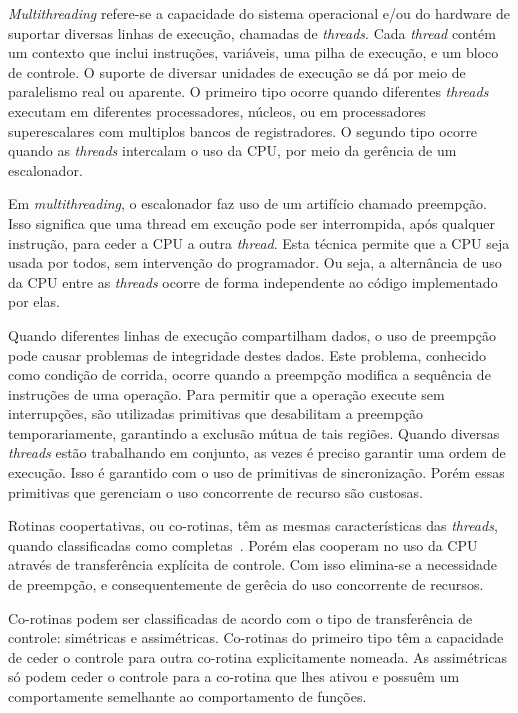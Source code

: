 \textit{Multithreading} refere-se a capacidade do sistema operacional e/ou do hardware de suportar diversas linhas de
execução, chamadas de \textit{threads}. Cada \textit{thread} contém um contexto que inclui instruções, variáveis, uma 
pilha de execução, e um bloco de controle. O suporte de diversar unidades de execução se dá por meio de paralelismo real
ou aparente. O primeiro tipo ocorre quando diferentes \textit{threads} executam em diferentes processadores, núcleos, ou
em processadores superescalares com multiplos bancos de registradores. O segundo tipo ocorre quando as \textit{threads}
intercalam o uso da CPU, por meio da gerência de um escalonador.

Em \textit{multithreading}, o escalonador faz uso de um artifício chamado preempção. Isso significa que uma thread em excução pode ser interrompida, 
após qualquer instrução, para ceder a CPU a outra \textit{thread}. Esta técnica permite que a CPU seja usada por todos, sem intervenção
do programador. Ou seja, a alternância de uso da CPU entre as \textit{threads} ocorre de forma independente ao código
implementado por elas.

Quando diferentes linhas de execução compartilham dados, o uso de preempção pode causar problemas de integridade destes
dados. Este problema, conhecido como condição de corrida, ocorre quando a preempção modifica a sequência de instruções
de uma operação. Para permitir que a operação execute sem interrupções, são utilizadas primitivas que desabilitam a
preempção temporariamente, garantindo a exclusão mútua de tais regiões.
Quando diversas \textit{threads} estão trabalhando em conjunto, as vezes é preciso garantir uma ordem de execução. Isso
é garantido com o uso de primitivas de sincronização.
Porém essas primitivas que gerenciam o uso concorrente de recurso são custosas.~\cite{Stallings/04}

Rotinas coopertativas, ou co-rotinas, têm as mesmas características das \textit{threads}, quando classificadas como
completas~\cite[s. 2.4]{Moura/04}. Porém elas cooperam no uso da CPU através de transferência explícita de controle. Com
isso elimina-se a necessidade de preempção, e consequentemente de gerêcia do uso concorrente de recursos.

Co-rotinas podem ser classificadas de acordo com o tipo de transferência de controle: simétricas e assimétricas. 
Co-rotinas do primeiro tipo têm a capacidade de ceder o controle para outra co-rotina explicitamente nomeada.
As assimétricas só podem ceder o controle para a co-rotina que lhes ativou e possuêm um comportamente semelhante ao
comportamento de funções.~\cite{Moura/04}

